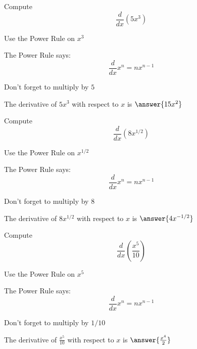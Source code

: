 \documentclass[handout]{ximera}
\begin{document}
\begin{problem} %
  Compute 
  \[
  \frac{d}{dx} \left(5x^3\right)
  \]
  
    \begin{hint}
      Use the Power Rule on $x^3$
    \end{hint}
    \begin{hint}
      The Power Rule says:
      \[
      \frac{d}{dx} x^n = nx^{n-1}
      \]
    \end{hint}
		\begin{hint}
		  Don't forget to multiply by $5$
		\end{hint}
		The derivative of $5x^3$ with respect to $x$ is
		 $\answer{15x^2}$
	
\end{problem}

\begin{problem} %
  Compute 
  \[
  \frac{d}{dx} \left(8x^{1/2}\right)
  \]
  
    \begin{hint}
      Use the Power Rule on $x^{1/2}$
    \end{hint}
    \begin{hint}
      The Power Rule says:
      \[
      \frac{d}{dx} x^n = nx^{n-1}
      \]
    \end{hint}
		\begin{hint}
		  Don't forget to multiply by $8$
		\end{hint}
		The derivative of $8x^{1/2}$ with respect to $x$ is
		 $\answer{4x^{-1/2}}$
	
\end{problem}

\begin{problem} %
  Compute 
  \[
  \frac{d}{dx} \left(\frac{x^5}{10}\right)
  \]
  
    \begin{hint}
      Use the Power Rule on $x^5$
    \end{hint}
    \begin{hint}
      The Power Rule says:
      \[
      \frac{d}{dx} x^n = nx^{n-1}
      \]
    \end{hint}
		\begin{hint}
		  Don't forget to multiply by $1/10$
		\end{hint}
		
		The derivative of $\frac{x^5}{10}$ with respect to $x$ is
		 $\answer{\frac{x^4}{2}}$
	
\end{problem}
\end{document}
